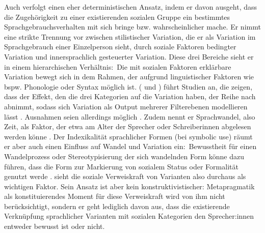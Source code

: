 Auch \citet[47--48, 52]{Preston.1991} verfolgt einen eher deterministischen Ansatz, indem er davon ausgeht, dass die Zugehörigkeit zu einer existierenden sozialen Gruppe ein bestimmtes Sprachgebrauchsverhalten mit sich bringe bzw. wahrscheinlicher mache. 
Er nimmt eine strikte Trennung vor zwischen stilistischer Variation, die er als Variation im Sprachgebrauch einer Einzelperson sieht, durch soziale Faktoren bedingter Variation und innersprachlich gesteuerter Variation. 
Diese drei Bereiche sieht er in einem hierarchischen Verh{\"a}ltnis:~Die mit sozialen Faktoren erkl{\"a}rbare Variation bewegt sich in dem Rahmen, der aufgrund linguistischer Faktoren wie bspw. Phonologie oder Syntax m{\"o}glich ist.
\citeauthor{Preston.1991} (\citeyear[]{Preston.1991} und \citeyear[]{Preston.2005}) f{\"u}hrt Studien an, die zeigen, dass der Effekt, den die drei Kategorien auf die Variation haben, der Reihe nach abnimmt, sodass sich Variation als Output mehrerer Filterebenen modellieren l{\"a}sst \citep[s.][280]{Preston.2005}. 
Ausnahmen seien allerdings m{\"o}glich \citep[s.][38--39]{Preston.1991}. 
Zudem nennt er Sprachwandel, also Zeit, als Faktor, der etwa am Alter der Sprecher oder Schreiberinnen abgelesen werden könne \citep[s.][40]{Preston.1991}. 
Der Indexikalit{\"a}t sprachlicher Formen (bei \citeauthor{Preston.1991} {\glqq}symbolic use{\grqq}) r{\"a}umt er aber auch einen Einfluss auf Wandel und Variation ein:~Bewusstheit f{\"u}r einen Wandelprozess oder Stereotypisierung der sich wandelnden Form k{\"o}nne dazu f{\"u}hren, dass die Form zur Markierung von sozialem Status oder Formalit{\"a}t genutzt werde \citep[s.][42]{Preston.1991}. 
\citet{Preston.1991} sieht die soziale Verweiskraft von Varianten also durchaus als wichtigen Faktor. 
Sein Ansatz ist aber kein konstruktivistischer: Metapragmatik als konstituierendes Moment für diese Verweiskraft wird von ihm nicht berücksichtigt, sondern er geht lediglich davon aus, dass die existierende Verknüpfung sprachlicher Varianten mit sozialen Kategorien den Sprecher:innen entweder bewusst ist oder nicht. 

